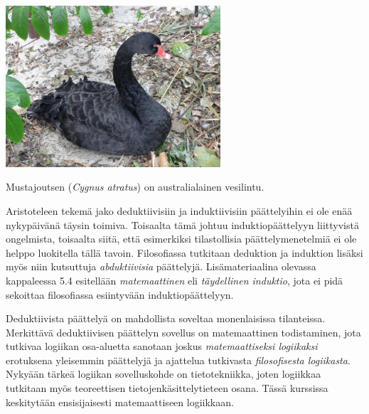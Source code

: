 \bigskip

\begin{center}
\includegraphics[width=8cm]{pictures/kuvitus/Cygnus_atratus1} %

Mustajoutsen ({\it Cygnus atratus}) on australialainen vesilintu.
\end{center}

\bigskip

Aristoteleen tekemä jako deduktiivisiin ja induktiivisiin päättelyihin ei ole enää nykypäivänä täysin toimiva. Toisaalta tämä johtuu induktiopäättelyyn liittyvistä ongelmista, toisaalta siitä, että esimerkiksi tilastollisia päättelymenetelmiä ei ole helppo luokitella tällä tavoin. Filosofiassa tutkitaan deduktion ja induktion lisäksi myös niin kutsuttuja \emph{abduktiivisia} päättelyjä. Lisämateriaalina olevassa kappaleessa 5.4 esitellään \emph{matemaattinen} eli \emph{täydellinen induktio}, jota ei pidä sekoittaa filosofiassa esiintyvään induktiopäättelyyn.

Deduktiivista päättelyä on mahdollista soveltaa monenlaisissa tilanteissa. Merkittävä deduktiivisen päättelyn sovellus on matemaattinen todistaminen, jota tutkivaa logiikan osa-aluetta sanotaan joskus \emph{matemaattiseksi logiikaksi} erotuksena yleisemmin päättelyjä ja ajattelua tutkivasta \emph{filosofisesta logiikasta}. Nykyään tärkeä logiikan sovelluskohde on tietotekniikka, joten logiikkaa tutkitaan myös teoreettisen tietojen\-käsittely\-tieteen osana. Tässä kurssissa keskitytään ensisijaisesti matemaattiseen logiikkaan.

